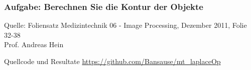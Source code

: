 \documentclass[aspectratio=169]{beamer}
\begin{document}
\begin{frame}
    \frametitle{Aufgabe: Berechnen Sie die Kontur der Objekte}
    \begin{alertblock} {Quelle:} 
        Foliensatz Medizintechnik 06 - Image Processing, Dezember 2011, Folie 32-38\\
        Prof. Andreas Hein
    \end{alertblock}
    \begin{alertblock}
        {Quellcode und Resultate}
        \url{https://github.com/Bansause/mt_laplaceOp}
    \end{alertblock}
\end{frame}
\end{document}
